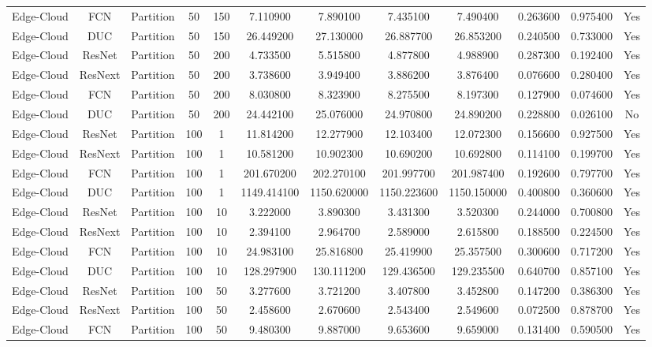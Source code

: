 \begin{tabular}{|c||c||c||c||c||c||c||c||c||c||c||c|}
Edge-Cloud & FCN & Partition & 50 & 150 & 7.110900 & 7.890100 & 7.435100 & 7.490400 & 0.263600 & 0.975400 & Yes \\
Edge-Cloud & DUC & Partition & 50 & 150 & 26.449200 & 27.130000 & 26.887700 & 26.853200 & 0.240500 & 0.733000 & Yes \\
Edge-Cloud & ResNet & Partition & 50 & 200 & 4.733500 & 5.515800 & 4.877800 & 4.988900 & 0.287300 & 0.192400 & Yes \\
Edge-Cloud & ResNext & Partition & 50 & 200 & 3.738600 & 3.949400 & 3.886200 & 3.876400 & 0.076600 & 0.280400 & Yes \\
Edge-Cloud & FCN & Partition & 50 & 200 & 8.030800 & 8.323900 & 8.275500 & 8.197300 & 0.127900 & 0.074600 & Yes \\
Edge-Cloud & DUC & Partition & 50 & 200 & 24.442100 & 25.076000 & 24.970800 & 24.890200 & 0.228800 & 0.026100 & No \\
Edge-Cloud & ResNet & Partition & 100 & 1 & 11.814200 & 12.277900 & 12.103400 & 12.072300 & 0.156600 & 0.927500 & Yes \\
Edge-Cloud & ResNext & Partition & 100 & 1 & 10.581200 & 10.902300 & 10.690200 & 10.692800 & 0.114100 & 0.199700 & Yes \\
Edge-Cloud & FCN & Partition & 100 & 1 & 201.670200 & 202.270100 & 201.997700 & 201.987400 & 0.192600 & 0.797700 & Yes \\
Edge-Cloud & DUC & Partition & 100 & 1 & 1149.414100 & 1150.620000 & 1150.223600 & 1150.150000 & 0.400800 & 0.360600 & Yes \\
Edge-Cloud & ResNet & Partition & 100 & 10 & 3.222000 & 3.890300 & 3.431300 & 3.520300 & 0.244000 & 0.700800 & Yes \\
Edge-Cloud & ResNext & Partition & 100 & 10 & 2.394100 & 2.964700 & 2.589000 & 2.615800 & 0.188500 & 0.224500 & Yes \\
Edge-Cloud & FCN & Partition & 100 & 10 & 24.983100 & 25.816800 & 25.419900 & 25.357500 & 0.300600 & 0.717200 & Yes \\
Edge-Cloud & DUC & Partition & 100 & 10 & 128.297900 & 130.111200 & 129.436500 & 129.235500 & 0.640700 & 0.857100 & Yes \\
Edge-Cloud & ResNet & Partition & 100 & 50 & 3.277600 & 3.721200 & 3.407800 & 3.452800 & 0.147200 & 0.386300 & Yes \\
Edge-Cloud & ResNext & Partition & 100 & 50 & 2.458600 & 2.670600 & 2.543400 & 2.549600 & 0.072500 & 0.878700 & Yes \\
Edge-Cloud & FCN & Partition & 100 & 50 & 9.480300 & 9.887000 & 9.653600 & 9.659000 & 0.131400 & 0.590500 & Yes \\

\end{tabular}
